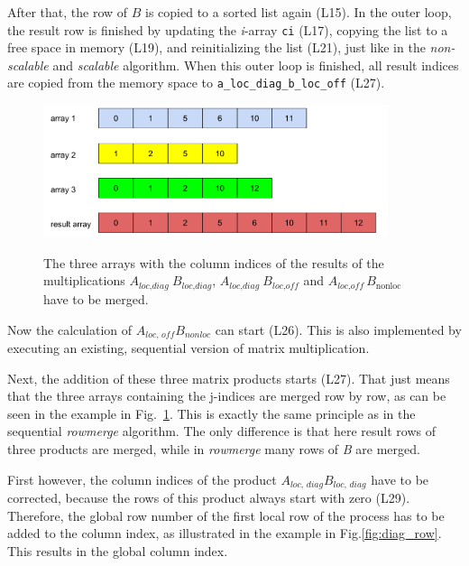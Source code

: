 After that, the row of $B$ is copied to a sorted list again (L15). In the outer loop, the result row is finished by updating the \textit{i}-array \texttt{ci} (L17), copying the list to a free space in memory (L19), and reinitializing the list (L21), just like in the \textit{non-scalable} and \textit{scalable} algorithm. When this outer loop is finished, all result indices are copied from the memory space to \texttt{a\_loc\_diag\_b\_loc\_off} (L27).

\begin{figure}[tbp]
\centering
\vspace{5mm}
{\includegraphics[width=0.9\textwidth]{mm_rowmerge}}
\caption{The three arrays with the column indices of the results of the multiplications $A_{\textit{loc,diag~}}B_{\textit{loc,diag}}$, $A_{\textit{loc,diag~}} B_{\textit{loc,off}}$ and $A_{\textit{loc,off}~} B_{\textrm{nonloc}}$ have to be merged.}
\label{fig:rowmerge}
\end{figure}

Now the calculation of $A_{\textit{loc, off}} B_{\textit{nonloc}}$ can start (L26). This is also implemented by executing an existing, sequential version of matrix multiplication. 

Next, the addition of these three matrix products starts (L27). That just means that the three arrays containing the j-indices are merged row by row, as can be seen in the example in Fig.~\ref{fig:rowmerge}. This is exactly the same principle as in the sequential \textit{rowmerge} algorithm. The only difference is that here result rows of three products are merged, while in \textit{rowmerge} many rows of \textit{B} are merged.


First however, the column indices of the product $A_{\textit{loc, diag}}B_{\textit{loc, diag}}$ have to be corrected, because the rows of this product always start with zero (L29). Therefore, the global row number of the first local row of the process has to be added to the column index, as illustrated in the example in Fig.\ref{fig:diag_row}. This results in the global column index.

